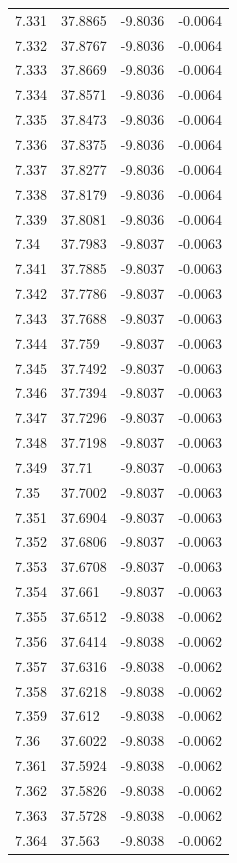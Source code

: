 \begin{tabular}{llll}
7.331 & 37.8865 & -9.8036 & -0.0064 \\
7.332 & 37.8767 & -9.8036 & -0.0064 \\
7.333 & 37.8669 & -9.8036 & -0.0064 \\
7.334 & 37.8571 & -9.8036 & -0.0064 \\
7.335 & 37.8473 & -9.8036 & -0.0064 \\
7.336 & 37.8375 & -9.8036 & -0.0064 \\
7.337 & 37.8277 & -9.8036 & -0.0064 \\
7.338 & 37.8179 & -9.8036 & -0.0064 \\
7.339 & 37.8081 & -9.8036 & -0.0064 \\
7.34 & 37.7983 & -9.8037 & -0.0063 \\
7.341 & 37.7885 & -9.8037 & -0.0063 \\
7.342 & 37.7786 & -9.8037 & -0.0063 \\
7.343 & 37.7688 & -9.8037 & -0.0063 \\
7.344 & 37.759 & -9.8037 & -0.0063 \\
7.345 & 37.7492 & -9.8037 & -0.0063 \\
7.346 & 37.7394 & -9.8037 & -0.0063 \\
7.347 & 37.7296 & -9.8037 & -0.0063 \\
7.348 & 37.7198 & -9.8037 & -0.0063 \\
7.349 & 37.71 & -9.8037 & -0.0063 \\
7.35 & 37.7002 & -9.8037 & -0.0063 \\
7.351 & 37.6904 & -9.8037 & -0.0063 \\
7.352 & 37.6806 & -9.8037 & -0.0063 \\
7.353 & 37.6708 & -9.8037 & -0.0063 \\
7.354 & 37.661 & -9.8037 & -0.0063 \\
7.355 & 37.6512 & -9.8038 & -0.0062 \\
7.356 & 37.6414 & -9.8038 & -0.0062 \\
7.357 & 37.6316 & -9.8038 & -0.0062 \\
7.358 & 37.6218 & -9.8038 & -0.0062 \\
7.359 & 37.612 & -9.8038 & -0.0062 \\
7.36 & 37.6022 & -9.8038 & -0.0062 \\
7.361 & 37.5924 & -9.8038 & -0.0062 \\
7.362 & 37.5826 & -9.8038 & -0.0062 \\
7.363 & 37.5728 & -9.8038 & -0.0062 \\
7.364 & 37.563 & -9.8038 & -0.0062 \\

\end{tabular}
